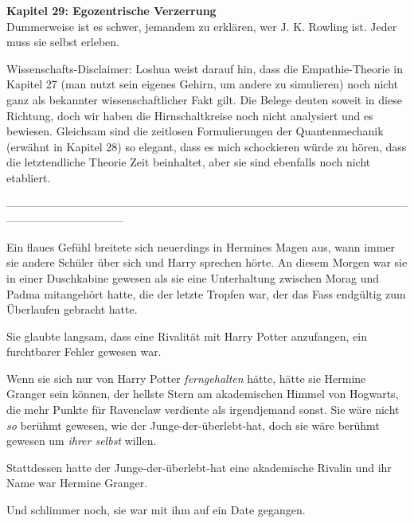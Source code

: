 

\hypertarget{egozentrische-verzerrung}{%

\textbf{Kapitel 29: Egozentrische Verzerrung}\\

\hfill\break Dummerweise ist es schwer, jemandem zu erklären, wer J. K. Rowling ist. Jeder muss sie selbst erleben.

Wissenschafts-Disclaimer: Loshua weist darauf hin, dass die Empathie-Theorie in Kapitel 27 (man nutzt sein eigenes Gehirn, um andere zu simulieren) noch nicht ganz als bekannter wissenschaftlicher Fakt gilt. Die Belege deuten soweit in diese Richtung, doch wir haben die Hirnschaltkreise noch nicht analysiert und es bewiesen. Gleichsam sind die zeitlosen Formulierungen der Quantenmechanik (erwähnt in Kapitel 28) so elegant, dass es mich schockieren würde zu hören, dass die letztendliche Theorie Zeit beinhaltet, aber sie sind ebenfalls noch nicht etabliert.

--------------------------------------------------------------------------------------------------------------------------------------------

\hfill\break Ein flaues Gefühl breitete sich neuerdings in Hermines Magen aus, wann immer sie andere Schüler über sich und Harry sprechen hörte. An diesem Morgen war sie in einer Duschkabine gewesen als sie eine Unterhaltung zwischen Morag und Padma mitangehört hatte, die der letzte Tropfen war, der das Fass endgültig zum Überlaufen gebracht hatte.

Sie glaubte langsam, dass eine Rivalität mit Harry Potter anzufangen, ein furchtbarer Fehler gewesen war.

Wenn sie sich nur von Harry Potter \emph{ferngehalten} hätte, hätte sie Hermine Granger sein können, der hellste Stern am akademischen Himmel von Hogwarts, die mehr Punkte für Ravenclaw verdiente als irgendjemand sonst. Sie wäre nicht \emph{so} berühmt gewesen, wie der Junge-der-überlebt-hat, doch sie wäre berühmt gewesen um \emph{ihrer selbst} willen.

Stattdessen hatte der Junge-der-überlebt-hat eine akademische Rivalin und ihr Name war Hermine Granger.

Und schlimmer noch, sie war mit ihm auf ein Date gegangen.

}
